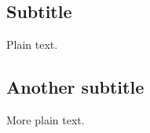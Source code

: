 \documentclass[%
	type=document,%
  	style=article,%
  	media=print,
  	pages=oneside,%
  	prefixLecturer=Dozenten:,
]{unihildesheim}
\begin{document}
\subsection{Subtitle}

Plain text.

\subsection{Another subtitle}

More plain text.
\end{document}
